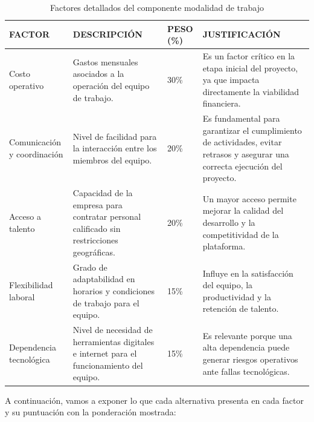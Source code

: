 \documentclass[12pt,a4paper]{article}
\begin{document}
\begin{table}[H]
\centering
\begin{tabular}{p{3cm}p{6cm}p{2cm}p{5cm}}
\toprule
\textbf{FACTOR} & \textbf{DESCRIPCIÓN} & \textbf{PESO (\%)} & \textbf{JUSTIFICACIÓN} \\
\midrule
Costo operativo & Gastos mensuales asociados a la operación del equipo de trabajo. & 30\% & Es un factor crítico en la etapa inicial del proyecto, ya que impacta directamente la viabilidad financiera. \\
\addlinespace
Comunicación y coordinación & Nivel de facilidad para la interacción entre los miembros del equipo. & 20\% & Es fundamental para garantizar el cumplimiento de actividades, evitar retrasos y asegurar una correcta ejecución del proyecto. \\
\addlinespace
Acceso a talento & Capacidad de la empresa para contratar personal calificado sin restricciones geográficas. & 20\% & Un mayor acceso permite mejorar la calidad del desarrollo y la competitividad de la plataforma. \\
\addlinespace
Flexibilidad laboral & Grado de adaptabilidad en horarios y condiciones de trabajo para el equipo. & 15\% & Influye en la satisfacción del equipo, la productividad y la retención de talento. \\
\addlinespace
Dependencia tecnológica & Nivel de necesidad de herramientas digitales e internet para el funcionamiento del equipo. & 15\% & Es relevante porque una alta dependencia puede generar riesgos operativos ante fallas tecnológicas. \\
\bottomrule
\end{tabular}
\caption{Factores detallados del componente modalidad de trabajo}
\end{table}

A continuación, vamos a exponer lo que cada alternativa presenta en cada factor y su puntuación con la ponderación mostrada:
\end{document}
